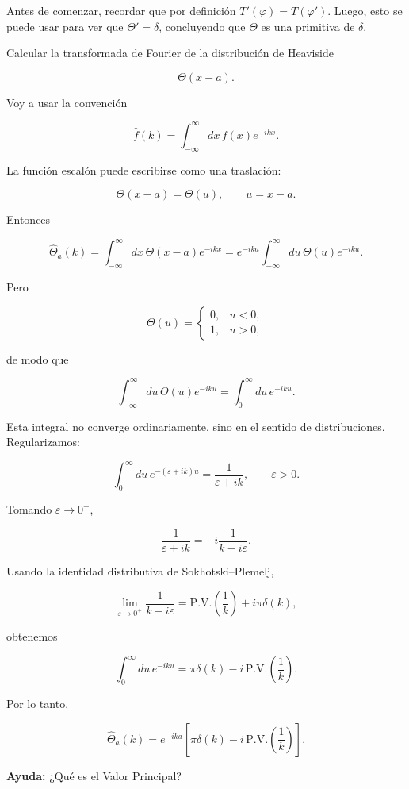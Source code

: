 \documentclass[11pt,spanish]{article}
\begin{document}
Antes de comenzar, recordar que  por definici\'on $T'(\varphi)=T(\varphi')$.
Luego, esto se puede usar para ver que $\Theta'=\delta$, concluyendo que $\Theta$ es una primitiva de $\delta$.

Calcular la transformada de Fourier de la distribución de Heaviside

$$
\Theta(x-a).
$$

Voy a usar la convención

$$
\hat{f}(k)
=
\int_{-\infty}^{\infty} dx\, f(x)e^{-ikx}.
$$

La función escalón puede escribirse como una traslación:

$$
\Theta(x-a)=\Theta(u), \qquad u=x-a.
$$

Entonces

$$
\hat{\Theta}_a(k)
=
\int_{-\infty}^{\infty} dx\, \Theta(x-a)e^{-ikx}
=
e^{-ika}
\int_{-\infty}^{\infty} du\, \Theta(u)e^{-iku}.
$$

Pero

$$
\Theta(u)=
\begin{cases}
0, & u<0,\\
1, & u>0,
\end{cases}
$$

de modo que

$$
\int_{-\infty}^{\infty}du\,\Theta(u)e^{-iku}
=
\int_0^\infty du\,e^{-iku}.
$$

Esta integral no converge ordinariamente, sino en el sentido de distribuciones. Regularizamos:

$$
\int_0^\infty du\, e^{-(\varepsilon+ik)u}
=
\frac{1}{\varepsilon+ik},
\qquad \varepsilon>0.
$$

Tomando $\varepsilon\to0^+$,

$$
\frac{1}{\varepsilon+ik}
=
-i\frac{1}{k-i\varepsilon}.
$$

Usando la identidad distributiva de Sokhotski–Plemelj,

$$
\lim_{\varepsilon\to0^+}\frac{1}{k-i\varepsilon}
=
\mathrm{P.V.}\left(\frac1k\right)+i\pi\delta(k),
$$

obtenemos

$$
\int_0^\infty 
du\,
e^{-iku}
=
\pi\delta(k)-i\,\mathrm{P.V.}\left(\frac1k\right).
$$

Por lo tanto,

$$
\boxed{
\hat{\Theta}_a(k)
=
e^{-ika}
\left[
\pi\delta(k)
-i\,
\mathrm{P.V.}
\left(
\frac{1}{k}
\right)
\right]
}.
$$

\vspace{0.5cm}
{\bf Ayuda:} ¿Qué es el Valor Principal?
\vspace{0.5cm}
\end{document}
